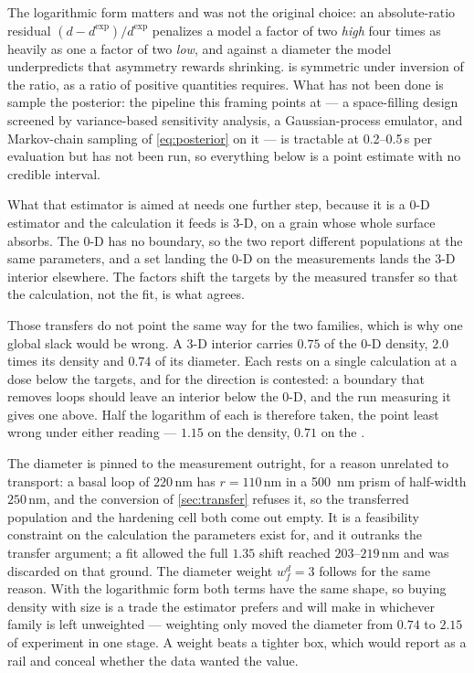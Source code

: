 The logarithmic form matters and was not the original choice: an absolute-ratio
residual $(d-d^{\exp})/d^{\exp}$ penalizes a model a factor of two \emph{high}
four times as heavily as one a factor of two \emph{low}, and against a diameter
the model underpredicts that asymmetry rewards shrinking.  is
symmetric under inversion of the ratio, as a ratio of positive quantities
requires. What has not been done is sample the posterior: the pipeline this
framing points at --- a space-filling design screened by variance-based
sensitivity analysis, a Gaussian-process emulator, and Markov-chain sampling of
\cref{eq:posterior} on it --- is tractable at 0.2--0.5\,s per evaluation but has
not been run, so everything below is a point estimate with no credible
interval.

\label{sec:slack}\label{sec:pinned}
What that estimator is aimed at needs one further step, because it is a $0$-D
estimator and the calculation it feeds is $3$-D, on a grain whose whole surface
absorbs. The $0$-D has no boundary, so the two report
different populations at the same parameters, and a set landing the $0$-D on the
measurements lands the $3$-D interior elsewhere. The factors shift the targets by
the measured transfer so that the calculation, not the fit, is what agrees.

Those transfers do not point the same way for the two families, which is why one
global slack would be wrong. A $3$-D interior carries $0.75$ of the $0$-D
\aloop{} density, $2.0$ times its \cloop{} density and $0.74$ of its \cloop{}
diameter. Each rests on a single calculation at a dose below the targets, and
for \cloop{} the direction is contested: a boundary that removes loops should
leave an interior below the $0$-D, and the run measuring it gives one above.
Half the logarithm of each is therefore taken, the point least wrong under
either reading --- $1.15$ on the \aloop{} density, $0.71$ on the \cloop{}.

The \cloop{} diameter is pinned to the measurement outright, for a reason
unrelated to transport: a basal loop of $220\,$nm has $r=110\,$nm in a
\SI{500}{\nano\meter} prism of half-width $250\,$nm, and the conversion of
\cref{sec:transfer} refuses it, so the transferred population and the hardening
cell both come out empty. It is a feasibility constraint on the calculation the
parameters exist for, and it outranks the transfer argument; a fit allowed the
full $1.35$ shift reached $203$--$219\,$nm and was discarded on that ground. The
diameter weight $w^{d}_f=3$ follows for the same reason. With the logarithmic
form both terms have the same shape, so buying density with size is a trade the
estimator prefers and will make in whichever family is left unweighted ---
weighting only \cloop{} moved the \aloop{} diameter from $0.74$ to $2.15$ of
experiment in one stage. A weight beats a tighter box, which would report as a
rail and conceal whether the data wanted the value.

